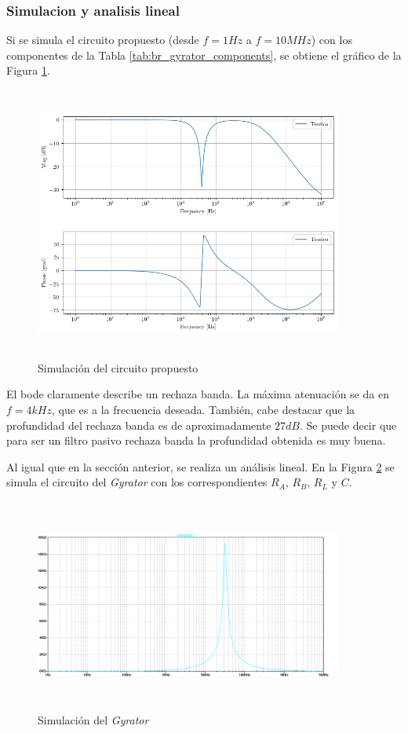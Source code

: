 \documentclass[12pt,a4paper]{article}
\begin{document}
\subsubsection{Simulacion y analisis lineal}
Si se simula el circuito propuesto (desde $f = 1 Hz$ a $f = 10MHz$) con los componentes de la Tabla \ref{tab:br_gyrator_components}, se obtiene el gráfico de la Figura \ref{ej2_br_sim}.

\begin{figure}[h!]                                                       
\centering\includegraphics[width=0.9\textwidth, height=9cm]{Resources/ej2_br_sim.png}
\caption{Simulación del circuito propuesto }
\label{ej2_br_sim}
\end{figure}

El bode claramente describe un rechaza banda. La máxima atenuación se da en $f= 4kHz$, que es a la frecuencia deseada. También, cabe destacar que la profundidad del rechaza banda es de aproximadamente $27 dB$. Se puede decir que para ser un filtro pasivo rechaza banda la profundidad obtenida es muy buena.  


Al igual que en la sección anterior, se realiza un análisis lineal. En la Figura \ref{fig:ej2_BR_gyrator_sim} se simula el circuito del \textit{Gyrator} con los correspondientes  $R_A$, $R_B$,  $R_L$ y $C$.



\begin{figure}[h!]                                                       
\centering\includegraphics[width=0.9\textwidth, height=7cm]{Resources/ej2_br_gyrator_sim.png}
\caption{Simulación del \textit{Gyrator} }
\label{fig:ej2_BR_gyrator_sim}
\end{figure}
\end{document}
